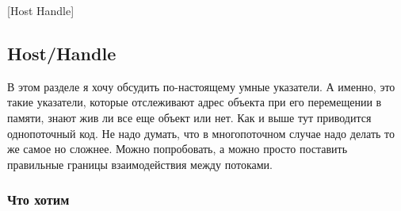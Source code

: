 [Host Handle]


\subsection{Host/Handle}
\label{section::TrackingPtr}

В этом разделе я хочу обсудить по-настоящему умные указатели.
А именно, это такие указатели, которые отслеживают адрес объекта при его перемещении в памяти, знают жив ли все еще объект или нет.
Как и выше тут приводится однопоточный код.
Не надо думать, что в многопоточном случае надо делать то же самое но сложнее.
Можно попробовать, а можно просто поставить правильные границы взаимодействия между потоками.

\subsubsection{Что хотим}

